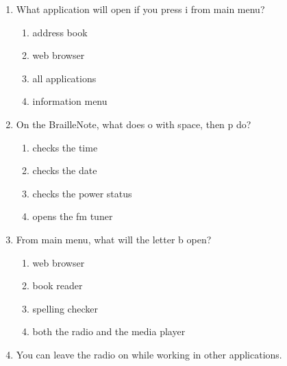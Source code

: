 \documentclass[10pt,letterpaper,twoside]{report}
\begin{document}
{{{{\begin{enumerate}
\begin{enumerate}
		            
	      \end{enumerate}
	\item What application will open if you press i from main menu?
	      
	      \begin{enumerate}
		      \item address book
		            
		      \item web browser
		            
		      \item all applications
		            
		      \item information menu
		            
		            
	      \end{enumerate}
	\item On the BrailleNote, what does o with space, then p do?
	      
	      \begin{enumerate}
		      \item checks the time
		            
		      \item checks the date
		            
		      \item checks the power status
		            
		      \item opens the fm tuner
		            
		            
	      \end{enumerate}
	\item From main menu, what will the letter b open?
	      
	      \begin{enumerate}
		      \item web browser
		            
		      \item book reader
		            
		      \item spelling checker
		            
		      \item both the radio and the media player
		            
		            
	      \end{enumerate}
	\item You can leave the radio on while working in other applications.
	      

\end{enumerate}}}}}
\end{document}

